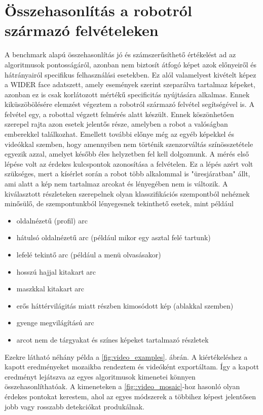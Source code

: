 \section{Összehasonlítás a robotról származó felvételeken}
A benchmark alapú összehasonlítás jó és számszerűsíthető értékelést ad az algoritmusok pontosságáról, azonban nem biztosít átfogó képet azok előnyeiről és hátrányairól specifikus felhasználási esetekben. Ez alól valamelyest kivételt képez a WIDER face adatszett, amely események szerint szeparálva tartalmaz képeket, azonban ez is csak korlátozott mértékű specificitás nyújtására alkalmas. Ennek kiküszöbölésére elemzést végeztem a robotról származó felvétel segítségével is. A felvétel egy, a robottal végzett felmérés alatt készült. Ennek köszönhetően szerepel rajta azon esetek jelentős része, amelyben a robot a valóságban emberekkel találkozhat. Emellett további előnye még az egyéb képekkel és videókkal szemben, hogy amennyiben nem történik szenzorváltás színösszetétele egyezik azzal, amelyet később éles helyzetben fel kell dolgoznunk. A mérés első lépése volt az érdekes kulcspontok azonosítása a felvételen. Ez a lépés azért volt szükséges, mert a kísérlet során a robot több alkalommal is "üresjáratban" állt, ami alatt a kép nem tartalmaz arcokat és lényegében nem is változik. A kiválasztott részleteken szerepelnek olyan klasszifikációs szempontból nehéznek minősülő, de szempontunkból lényegesnek tekinthető esetek, mint például
\begin{itemize}
    \item oldalnézetű (profil) arc
    \item hátulsó oldalnézetű arc (például mikor egy asztal felé tartunk)
    \item lefelé tekintő arc (például a menü olvasásakor)
    \item hosszú hajjal kitakart arc
    \item maszkkal kitakart arc
    \item erős háttérvilágitás miatt részben kimosódott kép (ablakkal szemben)
    \item gyenge megvilágítású arc
    \item arcot nem de tárgyakat és színes képeket tartalmazó részletek
\end{itemize}
Ezekre látható néhány példa a \ref{fig:video_examples}. ábrán. A kiértékeléshez a kapott eredményeket mozaikba rendeztem és videóként exportáltam. Így a kapott eredményt lejátszva az egyes algoritmusok kimenetei könnyen összehasonlíthatóak. A kimeneteken a \ref{fig::video_mosaic}-hoz hasonló olyan érdekes pontokat kerestem, ahol az egyes módszerek a többihez képest jelentősen jobb vagy rosszabb detekciókat produkálnak.

